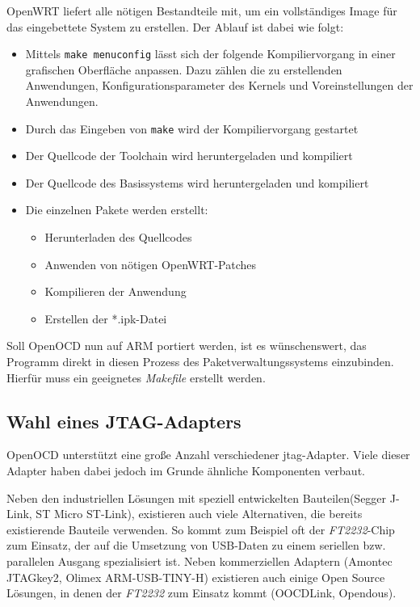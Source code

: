 \begin{minipage}[c]{\textwidth}
OpenWRT liefert alle nötigen Bestandteile mit, um ein vollständiges Image für
das eingebettete System zu erstellen.
Der Ablauf ist dabei wie folgt:
\begin{itemize}
  \item Mittels \texttt{make menuconfig} lässt sich der folgende
  Kompiliervorgang in einer grafischen Oberfläche anpassen. Dazu zählen die zu
  erstellenden Anwendungen, Konfigurationsparameter des Kernels und
  Voreinstellungen der Anwendungen.
  \item Durch das Eingeben von \texttt{make} wird der Kompiliervorgang
  gestartet
  \item Der Quellcode der Toolchain wird heruntergeladen und kompiliert
  \item Der Quellcode des Basissystems wird heruntergeladen und kompiliert
  \item Die einzelnen Pakete werden erstellt:
  \begin{itemize}
    \item Herunterladen des Quellcodes
    \item Anwenden von nötigen OpenWRT-Patches
    \item Kompilieren der Anwendung
    \item Erstellen der *.ipk-Datei
  \end{itemize}
\end{itemize}
\end{minipage}

Soll OpenOCD nun auf ARM portiert werden, ist es wünschenswert, das Programm
direkt in diesen Prozess des Paketverwaltungssystems einzubinden. Hierfür muss
ein geeignetes \emph{Makefile} erstellt werden.

\subsection{Wahl eines JTAG-Adapters}
OpenOCD unterstützt eine große Anzahl verschiedener \gls{jtag}-Adapter.
Viele dieser Adapter haben dabei jedoch im Grunde ähnliche Komponenten verbaut.

Neben den industriellen Lösungen mit speziell entwickelten Bauteilen(Segger
J-Link, ST Micro ST-Link), existieren auch viele Alternativen, die bereits
existierende Bauteile verwenden. So kommt zum Beispiel oft der
\emph{FT2232}-Chip zum Einsatz, der auf die Umsetzung von USB-Daten zu einem
seriellen bzw. parallelen Ausgang spezialisiert ist. Neben kommerziellen
Adaptern (Amontec JTAGkey2, Olimex ARM-USB-TINY-H) existieren auch einige Open
Source Lösungen, in denen der \emph{FT2232} zum Einsatz kommt (OOCDLink,
Opendous). 

